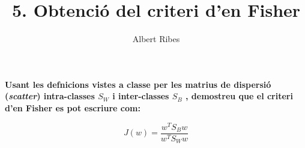 \documentclass[a4paper,10pt]{article}
\title{5. Obtenció del criteri d'en Fisher}
\author{Albert Ribes}
\begin{document}
\maketitle

%


\textbf{
Usant les defnicions vistes a classe per les matrius de dispersió (\textit{scatter}) intra-classes $S_W$ i inter-classes
$S_B$ , demostreu que el criteri d'en Fisher es pot escriure com:
}

\begin{equation*}
J(w) = \frac{w^TS_Bw}{w^TS_Ww}
\end{equation*}
\end{document}
